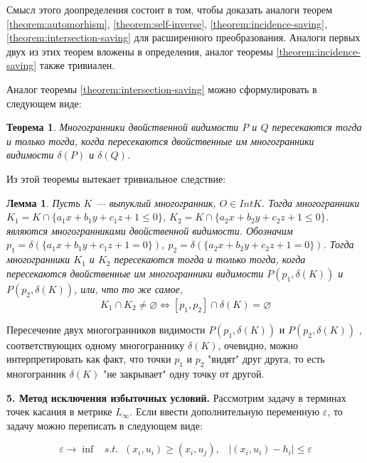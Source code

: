 \documentclass[a4paper, 10pt]{article}
\theoremstyle{definition}
\theoremstyle{plain}
\newtheorem{SmartTheorem}{Теорема}
\theoremstyle{plain}
\newtheorem{SmartLemma}{Лемма}
\begin{document}
Смысл этого доопределения состоит в том, чтобы доказать аналоги теорем
\ref{theorem:automorhism}, \ref{theorem:self-inverse},
\ref{theorem:incidence-saving}, \ref{theorem:intersection-saving} для
расширенного преобразования. Аналоги первых двух из этих теорем вложены в
определения, аналог теоремы \ref{theorem:incidence-saving} также тривиален.

Аналог теоремы \ref{theorem:intersection-saving} можно сформулировать в
следующем виде:

\begin{SmartTheorem}
 Многогранники двойственной видимости $P$ и $Q$ пересекаются тогда и только
 тогда, когда пересекаются двойственные им многогранники видимости
 $\delta(P)$ и $\delta(Q)$.
\end{SmartTheorem}

Из этой теоремы вытекает тривиальное следствие:

\begin{SmartLemma}
\label{lemma:expanded-intersection-saving}
 Пусть $K$ --- выпуклый многогранник, $O \in Int K$. Тогда многогранники
 $K_{1} = K \cap \{a_1 x + b_1 y + c_1 z + 1 \leq 0\}$,
 $K_{2} = K \cap \{a_2 x + b_2 y + c_2 z + 1 \leq 0\}$.
 являются многогранниками двойственной видимости. Обозначим
 $p_1 = \delta(\{a_1 x + b_1 y + c_1 z + 1 = 0\})$,
 $p_2 = \delta(\{a_2 x + b_2 y + c_2 z + 1 = 0\})$.
 Тогда многогранники $K_{1}$ и $K_{2}$ пересекаются тогда и только тогда, когда
 пересекаются двойственные им многогранники видимости $P(p_1, \delta(K))$ и
 $P(p_2, \delta(K))$, или, что то же самое,
 \begin{equation}
  K_{1} \cap K_{2} \neq \varnothing \Leftrightarrow
  [p_1, p_2] \cap \delta(K) = \varnothing
 \end{equation}
\end{SmartLemma}

Пересечение двух многогранников видимости $P(p_1, \delta(K))$ и
$P(p_2, \delta(K))$ , соответствующих одному многограннику $\delta(K)$,
очевидно, можно интерпретировать как факт, что точки $p_1$ и $p_2$ "видят" друг
друга, то есть многогранник $\delta(K)$ "не закрывает" одну точку от другой.

\textbf{5. Метод исключения избыточных условий.} Рассмотрим задачу в терминах
точек касания в метрике $L_{\infty}$. Если ввести дополнительную переменную
$\varepsilon$, то задачу можно переписать в следующем виде:

\begin{equation}
\label{equation:infinity-problem}
 \varepsilon \to \inf \;\;\;
 s. t. \;\; (x_{i}, u_{i}) \geq (x_{i}, u_{j}), \;\;\;
 |(x_{i}, u_{i}) - h_{i}| \leq \varepsilon
\end{equation}
\end{document}
